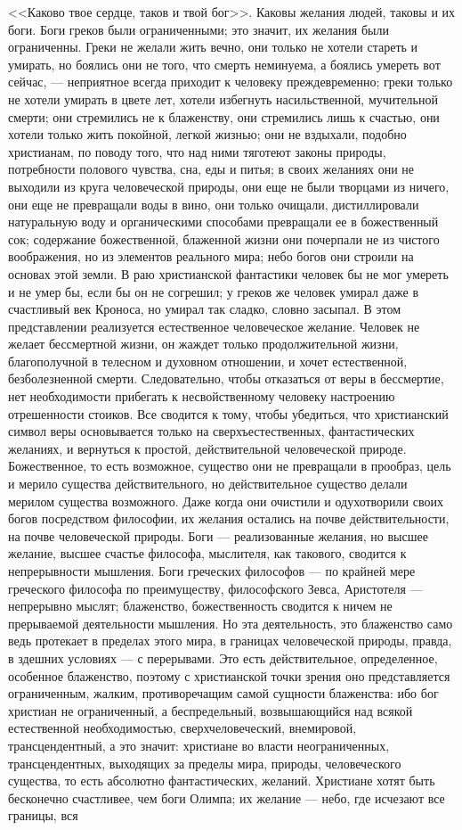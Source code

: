 \documentclass[12pt]{article}
\begin{document}
<<Каково твое сердце, таков и твой бог>>. Каковы желания людей, таковы и их боги. Боги греков были ограниченными; это значит, их желания были ограниченны. Греки не желали жить вечно, они только не хотели стареть и умирать, но боялись они не того, что смерть неминуема, а боялись умереть вот сейчас, --- неприятное всегда приходит к человеку преждевременно; греки только не хотели умирать в цвете лет, хотели избегнуть насильственной, мучительной смерти; они стремились не к блаженству, они стремились лишь к счастью, они хотели только жить покойной, легкой жизнью; они не вздыхали, подобно христианам, по поводу того, что над ними тяготеют законы природы, потребности полового чувства, сна, еды и питья; в своих желаниях они не выходили из круга человеческой природы, они еще не были творцами из ничего, они еще не превращали воды в вино, они только очищали, дистиллировали натуральную воду и органическими способами превращали ее в божественный сок; содержание божественной, блаженной жизни они почерпали не из чистого воображения, но из элементов реального мира; небо богов они строили на основах этой земли. В раю христианской фантастики человек бы не мог умереть и не умер бы, если бы он не согрешил; у греков же человек умирал даже в счастливый век Кроноса, но умирал так сладко, словно засыпал. В этом представлении реализуется естественное человеческое желание. Человек не желает бессмертной жизни, он жаждет только продолжительной жизни, благополучной в телесном и духовном отношении, и хочет естественной, безболезненной смерти. Следовательно, чтобы отказаться от веры в бессмертие, нет необходимости прибегать к несвойственному человеку настроению отрешенности стоиков. Все сводится к тому, чтобы убедиться, что христианский символ веры основывается только на сверхъестественных, фантастических желаниях, и вернуться к простой, действительной человеческой природе. Божественное, то есть возможное, существо они не превращали в прообраз, цель и мерило существа действительного, но действительное существо делали мерилом существа возможного. Даже когда они очистили и одухотворили своих богов посредством философии, их желания остались на почве действительности, на почве человеческой природы. Боги --- реализованные желания, но высшее желание, высшее счастье философа, мыслителя, как такового, сводится к непрерывности мышления. Боги греческих философов --- по крайней мере греческого философа по преимуществу, философского Зевса, Аристотеля --- непрерывно мыслят; блаженство, божественность сводится к ничем не прерываемой деятельности мышления. Но эта деятельность, это блаженство само ведь протекает в пределах этого мира, в границах человеческой природы, правда, в здешних условиях --- с перерывами. Это есть действительное, определенное, особенное блаженство, поэтому с христианской точки зрения оно представляется ограниченным, жалким, противоречащим самой сущности блаженства: ибо бог христиан не ограниченный, а беспредельный, возвышающийся над всякой естественной необходимостью, сверхчеловеческий, внемировой, трансцендентный, а это значит: христиане во власти неограниченных, трансцендентных, выходящих за пределы мира, природы, человеческого существа, то есть абсолютно фантастических, желаний. Христиане хотят быть бесконечно счастливее, чем боги Олимпа; их желание --- небо, где исчезают все границы, вся 
\end{document}
